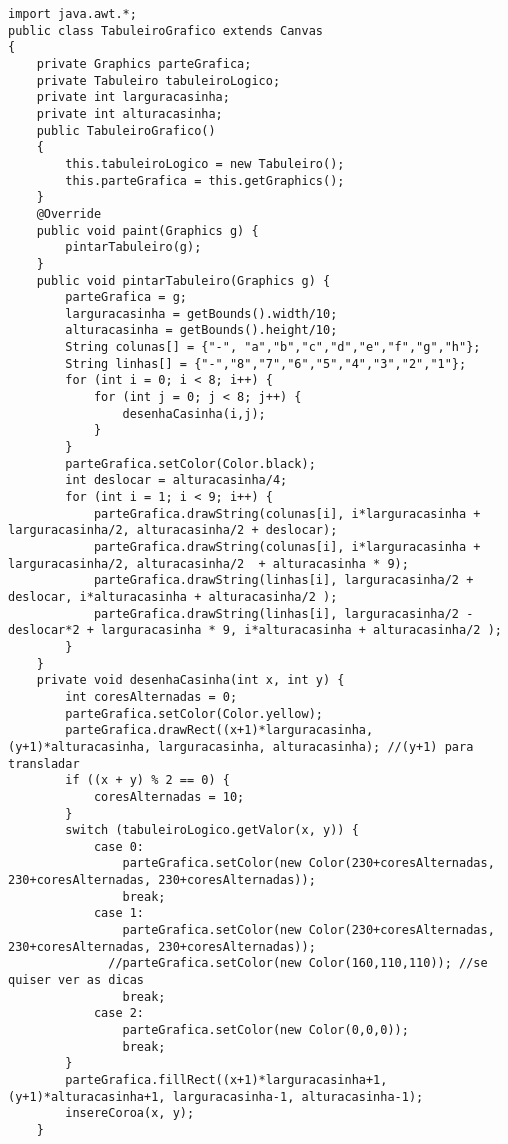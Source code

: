 \begin{lstlisting}
import java.awt.*;
public class TabuleiroGrafico extends Canvas 
{
    private Graphics parteGrafica;
    private Tabuleiro tabuleiroLogico;
    private int larguracasinha;
    private int alturacasinha; 
    public TabuleiroGrafico()
    {
        this.tabuleiroLogico = new Tabuleiro();
        this.parteGrafica = this.getGraphics();
    }
    @Override
    public void paint(Graphics g) {
        pintarTabuleiro(g);
    }   
    public void pintarTabuleiro(Graphics g) {
        parteGrafica = g;
        larguracasinha = getBounds().width/10;
        alturacasinha = getBounds().height/10;
        String colunas[] = {"-", "a","b","c","d","e","f","g","h"};
        String linhas[] = {"-","8","7","6","5","4","3","2","1"};
        for (int i = 0; i < 8; i++) {
            for (int j = 0; j < 8; j++) {
                desenhaCasinha(i,j);
            }
        }
        parteGrafica.setColor(Color.black);
        int deslocar = alturacasinha/4;
        for (int i = 1; i < 9; i++) { 
            parteGrafica.drawString(colunas[i], i*larguracasinha + larguracasinha/2, alturacasinha/2 + deslocar);
            parteGrafica.drawString(colunas[i], i*larguracasinha + larguracasinha/2, alturacasinha/2  + alturacasinha * 9);
            parteGrafica.drawString(linhas[i], larguracasinha/2 + deslocar, i*alturacasinha + alturacasinha/2 );
            parteGrafica.drawString(linhas[i], larguracasinha/2 -deslocar*2 + larguracasinha * 9, i*alturacasinha + alturacasinha/2 );
        }
    }
    private void desenhaCasinha(int x, int y) {
        int coresAlternadas = 0;
        parteGrafica.setColor(Color.yellow);
        parteGrafica.drawRect((x+1)*larguracasinha, (y+1)*alturacasinha, larguracasinha, alturacasinha); //(y+1) para transladar
        if ((x + y) % 2 == 0) {    
            coresAlternadas = 10;
        }     
        switch (tabuleiroLogico.getValor(x, y)) {
            case 0:
                parteGrafica.setColor(new Color(230+coresAlternadas, 230+coresAlternadas, 230+coresAlternadas)); 
                break;
            case 1:
                parteGrafica.setColor(new Color(230+coresAlternadas, 230+coresAlternadas, 230+coresAlternadas)); 
              //parteGrafica.setColor(new Color(160,110,110)); //se quiser ver as dicas
                break;
            case 2:
                parteGrafica.setColor(new Color(0,0,0));
                break;
        }
        parteGrafica.fillRect((x+1)*larguracasinha+1, (y+1)*alturacasinha+1, larguracasinha-1, alturacasinha-1);
        insereCoroa(x, y);
    }

\end{lstlisting}
